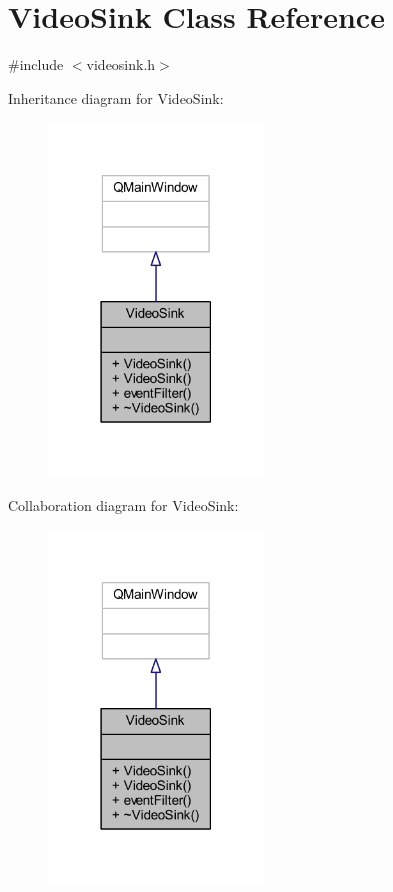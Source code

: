 \hypertarget{class_video_sink}{\section{Video\-Sink Class Reference}
\label{class_video_sink}
}


{\ttfamily \#include $<$videosink.\-h$>$}



Inheritance diagram for Video\-Sink\-:
\nopagebreak
\begin{figure}[H]
\begin{center}
\leavevmode
\includegraphics[width=162pt]{class_video_sink__inherit__graph}
\end{center}
\end{figure}


Collaboration diagram for Video\-Sink\-:
\nopagebreak
\begin{figure}[H]
\begin{center}
\leavevmode
\includegraphics[width=162pt]{class_video_sink__coll__graph}
\end{center}
\end{figure}
